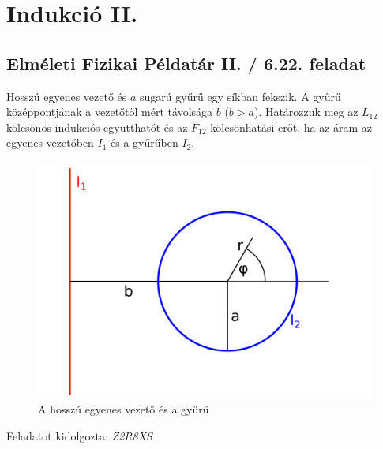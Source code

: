 \documentclass[11pt,a4paper,openany,leqno]{article}
\begin{document}
\section{Indukció II.}
\subsection{Elméleti Fizikai Példatár II. / 6.22. feladat}
Hosszú egyenes vezető és $a$ sugarú gyűrű egy síkban fekszik. A gyűrű középpontjának a vezetőtől mért távolsága $b$ ($b>a$). Határozzuk meg az $L_{12}$ kölcsönös indukciós együtthatót és az $F_{12}$ kölcsönhatási erőt, ha az áram az egyenes vezetőben $I_1$ és a gyűrűben $I_2$.

 \indent


\begin{figure}[h!]
\centering
  \includegraphics[width=120mm,scale=0.5]{kep.pdf}
  \caption{A hosszú egyenes vezető és a gyűrű}
  \label{}
\end{figure} 


\begin{flushright} {Feladatot kidolgozta: {\it Z2R8XS}} \end{flushright}

\vspace{0.5cm}
\end{document}
